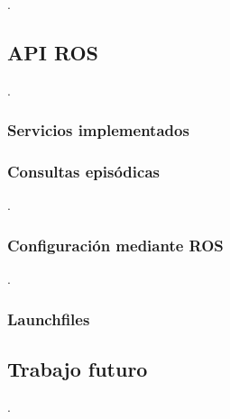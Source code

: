 .

\subsection{API ROS}

.

\subsubsection{Servicios implementados}



\subsubsection{Consultas episódicas}

.

\subsubsection{Configuración mediante ROS}

.
\lstset{style=/Style/yaml/ROS}


\subsubsection{Launchfiles}



\subsection{Trabajo futuro}

.



